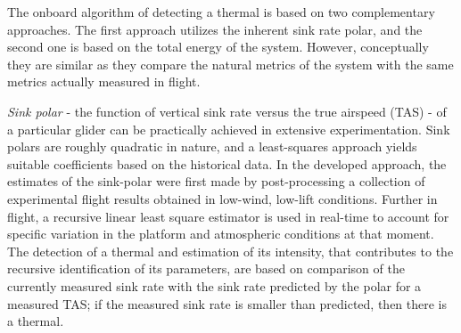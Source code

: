\documentclass[letterpaper, 10 pt, conference]{ieeeconf}  %
\begin{document}
The onboard algorithm of detecting a thermal is based on two complementary approaches. The first approach utilizes the inherent sink rate polar, and the second one is based on the total energy of the system. However, conceptually they are similar as they compare the natural metrics of the system with the same metrics actually measured in flight.

\emph{Sink polar} - the function of vertical sink rate versus the true airspeed (TAS) - of a particular glider can be practically achieved in extensive experimentation. Sink polars are roughly quadratic in nature, and a least-squares approach yields suitable coefficients based on the historical data. In the developed approach, the estimates of the sink-polar were first made by post-processing a collection of experimental flight results obtained in low-wind, low-lift conditions. Further in flight, a recursive linear least square estimator is used in real-time to account for specific variation in the platform and atmospheric conditions at that moment. The detection of a thermal and estimation of its intensity, that contributes to the recursive identification of its parameters, are based on comparison of the currently measured sink rate with the sink rate predicted by the polar for a measured TAS; if the measured sink rate is smaller than predicted, then there is a thermal.
\end{document}

